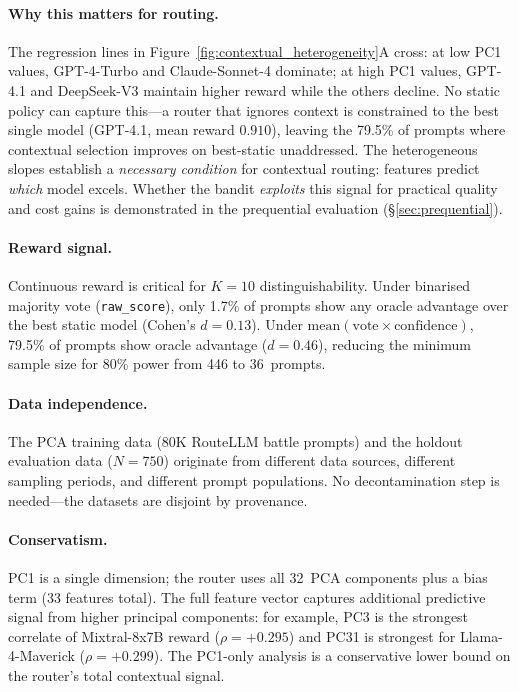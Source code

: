 
\paragraph{Why this matters for routing.}
The regression lines in Figure~\ref{fig:contextual_heterogeneity}A cross:
at low PC1 values, GPT-4-Turbo and Claude-Sonnet-4 dominate; at high
PC1 values, GPT-4.1 and DeepSeek-V3 maintain higher reward while the
others decline.
No static policy can capture this---a router that ignores context is
constrained to the best single model (GPT-4.1, mean reward $0.910$),
leaving the 79.5\% of prompts where contextual selection improves on
best-static unaddressed.
The heterogeneous slopes establish a \emph{necessary condition} for
contextual routing: features predict \emph{which} model excels.
Whether the bandit \emph{exploits} this signal for practical quality and
cost gains is demonstrated in the prequential evaluation
(\S\ref{sec:prequential}).

\paragraph{Reward signal.}
Continuous reward is critical for $K{=}10$ distinguishability.
Under binarised majority vote (\texttt{raw\_score}), only 1.7\% of prompts
show any oracle advantage over the best static model (Cohen's $d = 0.13$).
Under $\text{mean}(\text{vote} \times \text{confidence})$, 79.5\% of
prompts show oracle advantage ($d = 0.46$), reducing the minimum sample
size for 80\% power from 446 to 36~prompts.

\paragraph{Data independence.}
The PCA training data (80K RouteLLM battle prompts) and the holdout
evaluation data ($N{=}750$) originate from different data sources,
different sampling periods, and different prompt populations.
No decontamination step is needed---the datasets are disjoint by
provenance.

\paragraph{Conservatism.}
PC1 is a single dimension; the router uses all 32~PCA components plus
a bias term (33 features total).
The full feature vector captures additional predictive signal from
higher principal components: for example, PC3 is the strongest correlate
of Mixtral-8x7B reward ($\rho = {+}0.295$) and PC31 is strongest for
Llama-4-Maverick ($\rho = {+}0.299$).
The PC1-only analysis is a conservative lower bound on the router's
total contextual signal.
